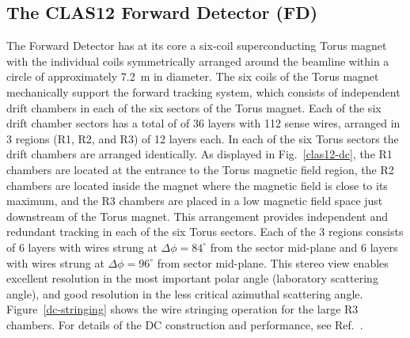 \documentclass[final,3p,twocolumn]{elsarticle}
\begin{document}
\subsection{The CLAS12 Forward Detector (FD)}

The Forward Detector has at its core a six-coil superconducting Torus magnet with the individual coils
symmetrically arranged around the beamline within a circle of approximately 7.2~m in diameter. The six coils of the
Torus magnet mechanically support the forward tracking system, which consists of independent drift chambers in
each of the six sectors of the Torus magnet. Each of the six drift chamber sectors has a total of of 36 layers with
112 sense wires, arranged in 3 regions (R1, R2, and R3) of 12 layers each. In each of the six Torus sectors the drift
chambers are arranged identically. As displayed in Fig.~\ref{clas12-dc}, the R1 chambers are located at the entrance
to the Torus magnetic field region, the R2 chambers are located inside the magnet where the magnetic field is close
to its maximum, and the R3 chambers are placed in a low magnetic field space just downstream of the Torus magnet.
This arrangement provides independent and redundant tracking in each of the six Torus sectors. Each of the 3 regions
consists of 6 layers with wires strung at $\Delta{\phi} = 84^\circ$ from the sector mid-plane and 6 layers with wires
strung at $\Delta{\phi} = 96^\circ$ from sector mid-plane. This stereo view enables excellent resolution in the most
important polar angle (laboratory scattering angle), and good resolution in the less critical azimuthal scattering angle.
Figure~\ref{dc-stringing} shows the wire stringing operation for the large R3 chambers. For details of the DC
construction and performance, see Ref.~\cite{DC}.
\end{document}
